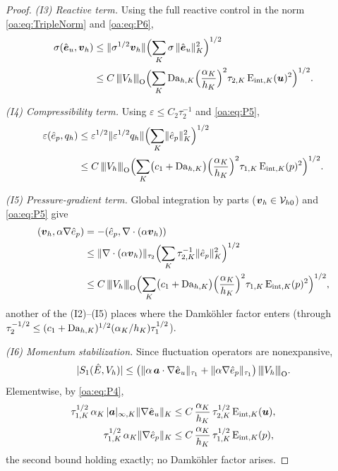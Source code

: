 \begin{proof}
\smallskip\noindent
\emph{(I3) Reactive term.} Using the full reactive control in the norm
\cref{oa:eq:TripleNorm} and \cref{oa:eq:P6},
\[
\begin{aligned}
  \sigma(\hat{\boldsymbol e}_u, \boldsymbol{v}_h)
  &\le \lVert \sigma^{1/2}\boldsymbol{v}_h \rVert\Bigl( \sum_K \sigma\,
  \lVert \hat{\boldsymbol e}_u \rVert_K^2 \Bigr)^{1/2} \\
  &\le C\,{\lvert\kern-0.25ex\lvert\kern-0.25ex\lvert V_h \rvert\kern-0.25ex\rvert\kern-0.25ex\rvert}_{\mathrm{O}}\Bigl( \sum_K \mathrm{Da}_{h,K}
  \Bigl(\frac{\alpha_K}{h_K}\Bigr)^2\tau_{2,K}\,\mathrm{E}_{\mathrm{int},K}(\boldsymbol{u})^2 \Bigr)^{1/2}.
\end{aligned}
\]

\smallskip\noindent
\emph{(I4) Compressibility term.} Using $\varepsilon \le C_2\tau_2^{-1}$ and
\cref{oa:eq:P5},
\[
\begin{aligned}
  \varepsilon(\hat e_p, q_h)
  &\le \varepsilon^{1/2}\lVert \varepsilon^{1/2}q_h \rVert
  \Bigl( \sum_K \lVert \hat e_p \rVert_K^2 \Bigr)^{1/2} \\
  &\le C\,{\lvert\kern-0.25ex\lvert\kern-0.25ex\lvert V_h \rvert\kern-0.25ex\rvert\kern-0.25ex\rvert}_{\mathrm{O}}\Bigl( \sum_K \bigl(c_1+\mathrm{Da}_{h,K}\bigr)
  \Bigl(\frac{\alpha_K}{h_K}\Bigr)^2\tau_{1,K}\,\mathrm{E}_{\mathrm{int},K}(p)^2 \Bigr)^{1/2}.
\end{aligned}
\]

\smallskip\noindent
\emph{(I5) Pressure-gradient term.} Global integration by parts
($\boldsymbol{v}_h \in \mathcal{V}_{h0}$) and \cref{oa:eq:P5} give
\[
\begin{aligned}
  (\boldsymbol{v}_h, \alpha\nabla\hat e_p)
  &= -(\hat e_p, \nabla\cdot(\alpha\boldsymbol{v}_h)) \\
  &\le \lVert \nabla\cdot(\alpha\boldsymbol{v}_h) \rVert_{\tau_2}
  \Bigl( \sum_K \tau_{2,K}^{-1}\lVert \hat e_p \rVert_K^2 \Bigr)^{1/2} \\
  &\le C\,{\lvert\kern-0.25ex\lvert\kern-0.25ex\lvert V_h \rvert\kern-0.25ex\rvert\kern-0.25ex\rvert}_{\mathrm{O}}\Bigl( \sum_K \bigl(c_1+\mathrm{Da}_{h,K}\bigr)
  \Bigl(\frac{\alpha_K}{h_K}\Bigr)^2\tau_{1,K}\,\mathrm{E}_{\mathrm{int},K}(p)^2 \Bigr)^{1/2},
\end{aligned}
\]
another of the (I2)--(I5) places where the Damk\"ohler factor enters (through
$\tau_2^{-1/2} \le (c_1+\mathrm{Da}_{h,K})^{1/2}(\alpha_K/h_K)\tau_1^{1/2}$).

\smallskip\noindent
\emph{(I6) Momentum stabilization.} Since fluctuation operators are nonexpansive,
\[
  |S_1(\hat E, V_h)|
  \le \bigl( \lVert \alpha\,\boldsymbol{a}\cdot\nabla\hat{\boldsymbol e}_u \rVert_{\tau_1}
  + \lVert \alpha\nabla\hat e_p \rVert_{\tau_1} \bigr)\,{\lvert\kern-0.25ex\lvert\kern-0.25ex\lvert V_h \rvert\kern-0.25ex\rvert\kern-0.25ex\rvert}_{\mathrm{O}}.
\]
Elementwise, by \cref{oa:eq:P4},
\[
\begin{aligned}
  \tau_{1,K}^{1/2}\,\alpha_K\,|\boldsymbol{a}|_{\infty,K}\lVert \nabla\hat{\boldsymbol e}_u \rVert_K
  &\le C\,\frac{\alpha_K}{h_K}\,\tau_{2,K}^{1/2}\,\mathrm{E}_{\mathrm{int},K}(\boldsymbol{u}),
  \qquad \\
  \tau_{1,K}^{1/2}\,\alpha_K\lVert \nabla\hat e_p \rVert_K
  &\le C\,\frac{\alpha_K}{h_K}\,\tau_{1,K}^{1/2}\,\mathrm{E}_{\mathrm{int},K}(p),
\end{aligned}
\]
the second bound holding exactly; no Damk\"ohler factor arises.


\end{proof}
